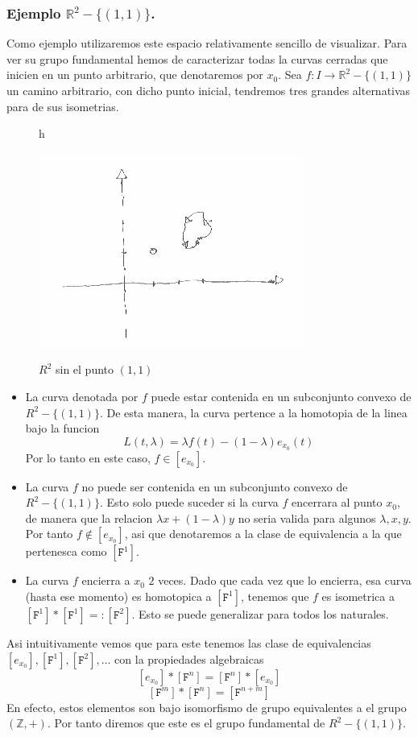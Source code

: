 {\subsubsection{Ejemplo \(\mathbb{R}^2 - \{(1,1)\}\).}
Como ejemplo utilizaremos este espacio relativamente sencillo de
visualizar. Para ver su grupo fundamental hemos de caracterizar todas la
curvas cerradas que inicien en un punto arbitrario, que denotaremos por
\(x_0\). Sea \(f : I \to \mathbb{R}^2 - \{(1,1)\}\) un camino
arbitrario, con dicho punto inicial, tendremos tres grandes alternativas
para de sus isometrias.
\begin{figure}{h}
  \caption{\(R^2\) sin el punto \((1,1)\)}
  \centering
  \includegraphics[scale=0.5]{./imagenes/R2-sin-un-punto.png}
  \label{fig:R2-sin-punto}
\end{figure}
\begin{itemize}
\item La curva denotada por \(f\) puede estar contenida en un subconjunto
  convexo de \(R^2 - \{(1,1)\}\). De esta manera, la curva pertence a la
  homotopia de la linea bajo la funcion
  \[ L (t,\lambda) = \lambda f (t) - (1 - \lambda) e_{x_0} (t)\]
  Por lo tanto en este caso, \(f \in [e_{x_0}]\).
\item La curva \(f\) no puede ser contenida en un subconjunto convexo de
  \(R^2 - \{ (1,1)\}\). Esto solo puede suceder si la curva \(f\)
  encerrara al punto \(x_0\), de manera que la relacion \(\lambda x +
  (1 - \lambda) y\) no seria valida para algunos \(\lambda, x, y\). Por
  tanto \(f \not \in [e_{x_0}]\), asi que denotaremos a la clase de
  equivalencia a la que pertenesca como \([\mathtt{F}^1]\).
\item La curva \(f\) encierra a \(x_0\) \(2\) veces. Dado que cada vez
  que lo encierra, esa curva (hasta ese momento) es homotopica a
  \([\mathtt F ^1]\), tenemos que \(f\) es isometrica a \( [\mathtt F
  ^1] * [\mathtt F ^1] =: [\mathtt F ^2]\). Esto se puede generalizar
  para todos los naturales.
\end{itemize}
Asi intuitivamente vemos que para este tenemos las clase de
equivalencias \([e_{x_0}], [\mathtt F ^1], [\mathtt F ^2], \dots \) con
la propiedades algebraicas
\[ [e_{x_0}] * [\mathtt F ^n] = [\mathtt F ^n] * [e_{x_0}]\]
\[ [\mathtt F ^m]  * [\mathtt F ^n] = [\mathtt F ^{n + m}]\]
En efecto, estos elementos son bajo isomorfismo de grupo equivalentes a
el grupo \((\mathbb{Z}, +)\). Por tanto diremos que este es el grupo
fundamental de \(R^2 - \{(1,1)\}\).

}
